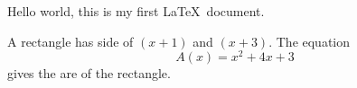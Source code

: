\documentclass[12pts]{article}
\begin{document}
Hello world, this is my first \LaTeX\ document.

A rectangle has side of $(x+1)$ and $(x+3)$. The equation $${A(x)= x^2+4x+3}$$ gives the are of the rectangle. 
\end{document}
